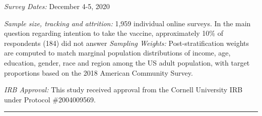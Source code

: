 \documentclass[
  12pt,
]{article}
\begin{document}
\emph{Survey Dates:} December 4-5, 2020

\emph{Sample size, tracking and attrition:} 1,959 individual online surveys. In the main question regarding intention to take the vaccine, approximately 10\% of respondents (184) did not answer
\emph{Sampling Weights:} Post-stratification weights are computed to match marginal population distributions of income, age, education, gender, race and region among the US adult population, with target proportions based on the 2018 American Community Survey.

\emph{IRB Approval:} This study received approval from the Cornell University IRB under Protocol \#2004009569.

\begin{center}\rule{0.5\linewidth}{0.5pt}\end{center}

\newpage
\end{document}
